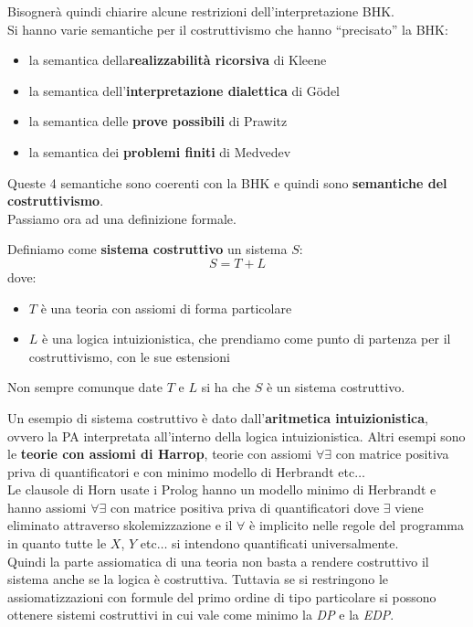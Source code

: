 \documentclass[a4paper,12pt, oneside]{book}
\begin{document}
Bisognerà quindi chiarire alcune restrizioni dell'interpretazione BHK.\\
Si hanno varie semantiche per il costruttivismo che hanno ``precisato'' la BHK:
\begin{itemize}
  \item la semantica della\textbf{realizzabilità ricorsiva} di Kleene
  \item la semantica dell'\textbf{interpretazione dialettica} di G\"{o}del
  \item la semantica delle \textbf{prove possibili} di Prawitz
  \item la semantica dei \textbf{problemi finiti} di Medvedev
\end{itemize}
Queste 4 semantiche sono coerenti con la BHK e quindi sono \textbf{semantiche
  del costruttivismo}.\\
Passiamo ora ad una definizione formale.
\begin{definizione}
  Definiamo come \textbf{sistema costruttivo} un sistema $S$:
  \[S=T+L\]
  dove:
  \begin{itemize}
    \item $T$ è una teoria con assiomi di forma particolare
    \item $L$ è una logica intuizionistica, che prendiamo come punto di partenza
    per il costruttivismo, con le sue estensioni
  \end{itemize}
  Non sempre comunque date $T$ e $L$ si ha che $S$ è un sistema costruttivo.
\end{definizione}
Un esempio di sistema costruttivo è dato dall'\textbf{aritmetica
  intuizionistica}, ovvero la PA interpretata all'interno della logica
intuizionistica. Altri esempi sono le \textbf{teorie con assiomi di Harrop},
teorie con assiomi $\forall\exists$ con matrice positiva priva di quantificatori
e con minimo modello di Herbrandt etc$\ldots$\\ 
Le clausole di Horn usate i Prolog hanno un
modello minimo di Herbrandt e hanno  assiomi $\forall\exists$ con matrice
positiva priva di quantificatori dove $\exists$ viene eliminato attraverso
skolemizzazione e il $\forall$ è implicito nelle regole del programma in quanto
tutte le $X$, $Y$ etc$\ldots$ si intendono quantificati universalmente.\\
Quindi la parte assiomatica di una teoria non basta a rendere costruttivo il
sistema anche se la logica è costruttiva. Tuttavia se si restringono le
assiomatizzazioni con formule del primo ordine di tipo particolare si possono
ottenere sistemi costruttivi in cui vale come minimo la \textit{DP} e la
\textit{EDP}.
\end{document}
